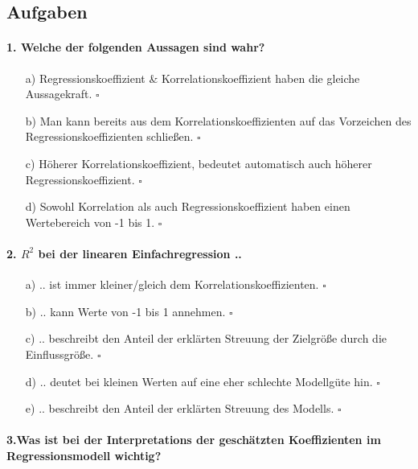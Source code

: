 \documentclass[a4paper]{article}
\begin{document}
\clearpage

\subsection{Aufgaben}

\paragraph{1. Welche der folgenden Aussagen sind wahr?}

\begin{itemize}
    \item[a)] Regressionskoeffizient \& Korrelationskoeffizient haben die gleiche Aussagekraft. \hfill $\square$
    \item[b)] Man kann bereits aus dem Korrelationskoeffizienten auf das Vorzeichen des\\Regressionskoeffizienten schließen. \hfill $\square$
    \item[c)] Höherer Korrelationskoeffizient, bedeutet automatisch auch höherer\\Regressionskoeffizient. \hfill $\square$
    \item[d)] Sowohl Korrelation als auch Regressionskoeffizient haben einen Wertebereich von -1 bis 1. \hfill $\square$
\end{itemize}

\paragraph{2. $R^2$ bei der linearen Einfachregression ..}

\begin{itemize}
    \item[a)] .. ist immer kleiner/gleich dem Korrelationskoeffizienten. \hfill $\square$
    \item[b)] .. kann Werte von -1 bis 1 annehmen. \hfill $\square$
    \item[c)] .. beschreibt den Anteil der erklärten Streuung der Zielgröße durch die Einflussgröße. \hfill $\square$
    \item[d)] .. deutet bei kleinen Werten auf eine eher schlechte Modellgüte hin. \hfill $\square$
    \item[e)] .. beschreibt den Anteil der erklärten Streuung des Modells. \hfill $\square$
\end{itemize}

\paragraph{3.Was ist bei der Interpretations der geschätzten Koeffizienten im Regressionsmodell wichtig?}
\end{document}
